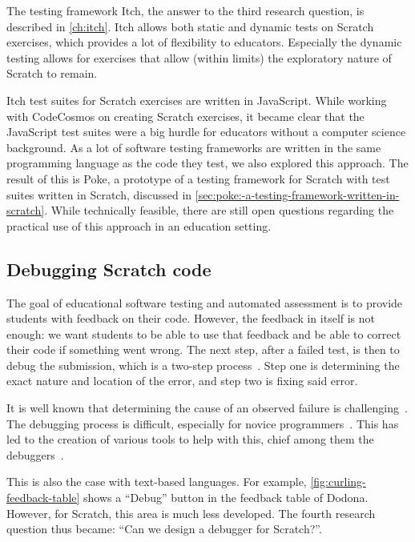 \documentclass[../main]{subfiles}
\begin{document}
The testing framework Itch, the answer to the third research question, is described in \cref{ch:itch}.
Itch allows both static and dynamic tests on Scratch exercises, which provides a lot of flexibility to educators.
Especially the dynamic testing allows for exercises that allow (within limits) the exploratory nature of Scratch to remain.

Itch test suites for Scratch exercises are written in JavaScript.
While working with CodeCosmos on creating Scratch exercises, it became clear that the JavaScript test suites were a big hurdle for educators without a computer science background.
As a lot of software testing frameworks are written in the same programming language as the code they test, we also explored this approach.
The result of this is Poke, a prototype of a testing framework for Scratch with test suites written in Scratch, discussed in \cref{sec:poke:-a-testing-framework-written-in-scratch}.
While technically feasible, there are still open questions regarding the practical use of this approach in an education setting.

\subsection{Debugging Scratch code}\label{subsec:debugging-scratch-code}

The goal of educational software testing and automated assessment is to provide students with feedback on their code.
However, the feedback in itself is not enough: we want students to be able to use that feedback and be able to correct their code if something went wrong.
The next step, after a failed test, is then to debug the submission, which is a two-step process~\autocite{myersArtSoftwareTesting2012}.
Step one is determining the exact nature and location of the error, and step two is fixing said error.

It is well known that determining the cause of an observed failure is challenging~\autocite{ammannIntroductionSoftwareTesting2016}.
The debugging process is difficult, especially for novice programmers~\autocite{mccauleyDebuggingReviewLiterature2008}.
This has led to the creation of various tools to help with this, chief among them the debuggers~\autocite{rosenbergHowDebuggersWork1996}.

This is also the case with text-based languages.
For example, \cref{fig:curling-feedback-table} shows a ``Debug'' button in the feedback table of Dodona.
However, for Scratch, this area is much less developed.
The fourth research question thus became: ``Can we design a debugger for Scratch?''.
\end{document}
